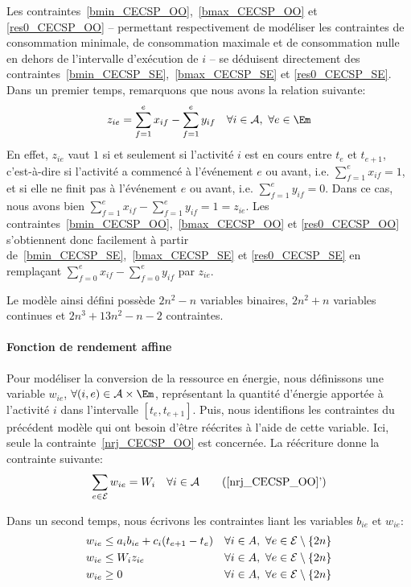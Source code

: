 Les contraintes~\eqref{bmin_CECSP_OO},~\eqref{bmax_CECSP_OO} et
\eqref{res0_CECSP_OO} -- permettant respectivement de modéliser les
contraintes de consommation minimale, de consommation maximale et de
consommation nulle en dehors de l'intervalle d'exécution de $i$ -- se
déduisent directement des
contraintes~\eqref{bmin_CECSP_SE},~\eqref{bmax_CECSP_SE} et
\eqref{res0_CECSP_SE}. Dans un premier temps, remarquons que nous
avons la relation suivante:
\begin{equation}
\label{SEversOO}
z_{ie} = \sum_{f=1}^e x_{if} -  \sum_{f=1}^e y_{if} \quad \forall i
\in \A,\ \forall e\in \Em
\end{equation}
En effet, $z_{ie}$ vaut $1$ si et seulement si l'activité $i$ est en
cours entre $t_e$ et $t_{e+1}$, c'est-à-dire si l'activité a commencé à
l'événement $e$ ou avant, i.e. $\sum_{f=1}^ex_{if}=1$, et si elle
ne finit pas à l'événement $e$ ou avant, i.e. $\sum_{f=1}^ey_{if}=
0$. Dans ce cas, nous avons bien $\sum_{f=1}^ex_{if} -
\sum_{f=1}^ey_{if}= 1 = z_{ie}$. Les
contraintes~\eqref{bmin_CECSP_OO},~\eqref{bmax_CECSP_OO} et
\eqref{res0_CECSP_OO} s'obtiennent donc facilement à partir
de~\eqref{bmin_CECSP_SE},~\eqref{bmax_CECSP_SE} et
\eqref{res0_CECSP_SE} en remplaçant $\sum_{f=0}^{e}
x_{if}-\sum_{f=0}^{e}y_{if}$ par $z_{ie}$.


Le modèle ainsi défini possède $2n^2-n$ variables binaires, $2n^2+n$
variables continues et $2n^3+13n^2-n-2$ contraintes.    

\paragraph{Fonction de rendement affine}

Pour modéliser la conversion de la ressource en énergie, nous
définissons une variable $w_{ie}$, $\forall (i,e) \in \A \times \Em$,
représentant la quantité d'énergie 
apportée à l'activité $i$ dans l'intervalle $[t_e,t_{e+1}]$. Puis,
nous identifions les contraintes du précédent modèle qui ont besoin
d'être réécrites à l'aide de cette variable. Ici, seule la
contrainte~\eqref{nrj_CECSP_OO} est concernée. La réécriture donne la
contrainte suivante:
\begin{equation}
\sum_{e\in \E} w_{ie}=W_i \quad \forall i \in \A
\tag{\ref{nrj_CECSP_OO}'}
\end{equation}

Dans un second temps, nous écrivons les contraintes liant les variables
$b_{ie}$ et $w_{ie}$:
\begin{align}
  &w_{ie} \le a_ib_{ie}+c_i(t_{e+1}-t_e) & & \forall i \in A,\ \forall
  e \in {\cal E} \setminus\{2n\} \label{conv1_CECSP_OO}\\
  &w_{ie} \le W_i z_{ie} & & \forall i \in A,\ \forall e \in
                             {\cal E}\setminus\{2n\} \label{conv2_CECSP_OO}\\ 
  & w_{ie} \ge 0 & & \forall i \in A,\ \forall e \in {\cal E}\setminus\{2n\}
  \label{Bw_CECSP_OO}
\end{align}

